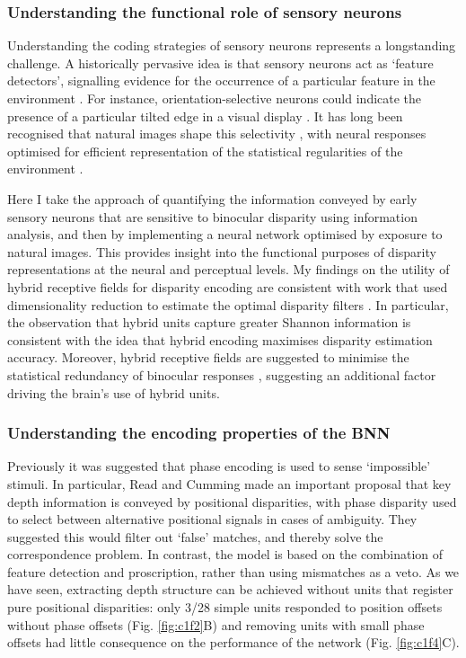 \subsubsection*{Understanding the functional role of sensory neurons}

Understanding the coding strategies of sensory neurons represents a longstanding challenge. A historically pervasive idea is that sensory neurons act as `feature detectors', signalling evidence for the occurrence of a particular feature in the environment \cite{Barlow:1953ep, Lettvin:1959gs}. For instance, orientation-selective neurons could indicate the presence of a particular tilted edge in a visual display \cite{HUBEL:1959tz}. It has long been recognised that natural images shape this selectivity \cite{Barlow:1961fe, Simoncelli:2001dn}, with neural responses optimised for efficient representation of the statistical regularities of the environment \cite{Karklin:2009hl, Li:1994jm}. 

Here I take the approach of quantifying the information conveyed by early sensory neurons that are sensitive to binocular disparity using information analysis, and then by implementing a neural network optimised by exposure to natural images. This provides insight into the functional purposes of disparity representations at the neural and perceptual levels. My findings on the utility of hybrid receptive fields for disparity encoding are consistent with work that used dimensionality reduction to estimate the optimal disparity filters \cite{Burge:2014qj}. In particular, the observation that hybrid units capture greater Shannon information is consistent with the idea that hybrid encoding maximises disparity estimation accuracy. Moreover, hybrid receptive fields are suggested to minimise the statistical redundancy of binocular responses \cite{Okajima:2004cy,Hunter:2015kx, Hunter:2016gb}, suggesting an additional factor driving the brain's use of hybrid units.

\subsubsection*{Understanding the encoding properties of the BNN}

Previously it was suggested that phase encoding is used to sense `impossible' stimuli. In particular, Read and Cumming \cite{Read:2007nx} made an important proposal that key depth information is conveyed by positional disparities, with phase disparity used to select between alternative positional signals in cases of ambiguity. They suggested this would filter out `false' matches, and thereby solve the correspondence problem. In contrast, the model is based on the combination of feature detection and proscription, rather than using mismatches as a veto. As we have seen, extracting depth structure can be achieved without units that register pure positional disparities: only 3/28 simple units responded to position offsets without phase offsets (Fig. \ref{fig:c1f2}B) and removing units with small phase offsets had little consequence on the performance of the network (Fig. \ref{fig:c1f4}C). 

